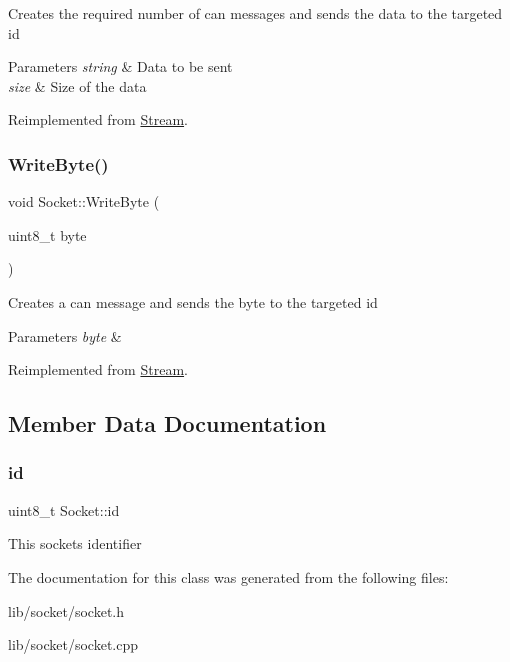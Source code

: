 Creates the required number of can messages and sends the data to the targeted id 
\begin{DoxyParams}{Parameters}
{\em string} & Data to be sent \\
\hline
{\em size} & Size of the data \\
\hline
\end{DoxyParams}


Reimplemented from \hyperlink{class_stream_a508be3423e4d99ab2757275fb723002a}{Stream}.

\hypertarget{class_socket_a548abd20eea1430230a77829e99c818a}{}\label{class_socket_a548abd20eea1430230a77829e99c818a} 
\subsubsection{\texorpdfstring{Write\+Byte()}{WriteByte()}}
{\footnotesize\ttfamily void Socket\+::\+Write\+Byte (\begin{DoxyParamCaption}\item[{uint8\+\_\+t}]{byte }\end{DoxyParamCaption})\hspace{0.3cm}{\ttfamily [virtual]}}

Creates a can message and sends the byte to the targeted id 
\begin{DoxyParams}{Parameters}
{\em byte} & \\
\hline
\end{DoxyParams}


Reimplemented from \hyperlink{class_stream_aeaed767b3a8d946c6f81465fa83ff17f}{Stream}.



\subsection{Member Data Documentation}
\hypertarget{class_socket_a1cbe7e5484756b0852a3e2a201341dca}{}\label{class_socket_a1cbe7e5484756b0852a3e2a201341dca} 
\subsubsection{\texorpdfstring{id}{id}}
{\footnotesize\ttfamily uint8\+\_\+t Socket\+::id\hspace{0.3cm}{\ttfamily [private]}}

This sockets identifier 

The documentation for this class was generated from the following files\+:\begin{DoxyCompactItemize}
\item 
lib/socket/socket.\+h\item 
lib/socket/socket.\+cpp\end{DoxyCompactItemize}

